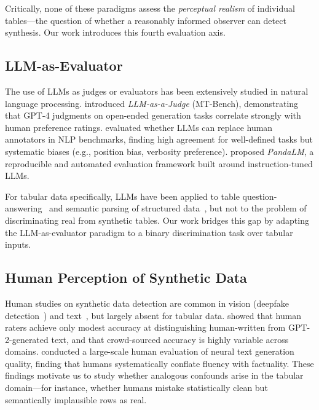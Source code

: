 \documentclass[runningheads]{llncs}
\begin{document}
Critically, none of these paradigms assess the \emph{perceptual
realism} of individual tables---the question of whether a reasonably
informed observer can detect synthesis.
Our work introduces this fourth evaluation axis.

\subsection{LLM-as-Evaluator}

The use of LLMs as judges or evaluators has been extensively studied
in natural language processing.
\citet{zheng2023judging} introduced \emph{LLM-as-a-Judge} (MT-Bench),
demonstrating that GPT-4 judgments on open-ended generation tasks
correlate strongly with human preference ratings.
\citet{chiang2023large} evaluated whether LLMs can replace human
annotators in NLP benchmarks, finding high agreement for well-defined
tasks but systematic biases (e.g., position bias, verbosity preference).
\citet{wang2023large} proposed \emph{PandaLM}, a reproducible and
automated evaluation framework built around instruction-tuned LLMs.

For tabular data specifically, LLMs have been applied to table
question-answering~\cite{herzig2020tapas} and semantic parsing of
structured data~\cite{ye2023large}, but not to the problem of
discriminating real from synthetic tables.
Our work bridges this gap by adapting the LLM-as-evaluator paradigm
to a binary discrimination task over tabular inputs.

\subsection{Human Perception of Synthetic Data}

Human studies on synthetic data detection are common in vision
(deepfake detection~\cite{rossler2019faceforensics}) and
text~\cite{ippolito2020automatic,clark2021all}, but largely absent for
tabular data.
\citet{ippolito2020automatic} showed that human raters achieve only
modest accuracy at distinguishing human-written from GPT-2-generated
text, and that crowd-sourced accuracy is highly variable across domains.
\citet{clark2021all} conducted a large-scale human evaluation of
neural text generation quality, finding that humans systematically
conflate fluency with factuality.
These findings motivate us to study whether analogous confounds
arise in the tabular domain---for instance, whether humans mistake
statistically clean but semantically implausible rows as real.
\end{document}
